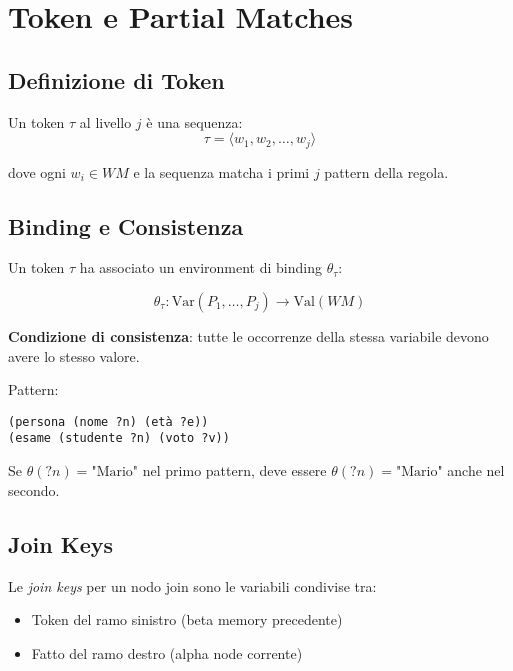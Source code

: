 \section{Token e Partial Matches}

\subsection{Definizione di Token}

\begin{definizione}[Token]
Un token $\tau$ al livello $j$ è una sequenza:
\begin{equation}
\tau = \langle w_1, w_2, \ldots, w_j \rangle
\end{equation}

dove ogni $w_i \in WM$ e la sequenza matcha i primi $j$ pattern della regola.
\end{definizione}

\subsection{Binding e Consistenza}

Un token $\tau$ ha associato un environment di binding $\theta_\tau$:

\begin{equation}
\theta_\tau: \text{Var}(P_1, \ldots, P_j) \to \text{Val}(WM)
\end{equation}

\textbf{Condizione di consistenza}: tutte le occorrenze della stessa variabile devono avere lo stesso valore.

\begin{esempio}
Pattern:
\begin{lstlisting}[language=CLIPS]
(persona (nome ?n) (età ?e))
(esame (studente ?n) (voto ?v))
\end{lstlisting}

Se $\theta(?n) = \text{"Mario"}$ nel primo pattern, deve essere $\theta(?n) = \text{"Mario"}$ anche nel secondo.
\end{esempio}

\subsection{Join Keys}

\begin{definizione}
Le \textit{join keys} per un nodo join sono le variabili condivise tra:
\begin{itemize}
\item Token del ramo sinistro (beta memory precedente)
\item Fatto del ramo destro (alpha node corrente)
\end{itemize}
\end{definizione}

